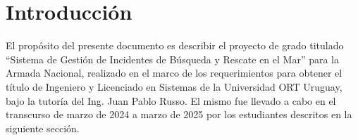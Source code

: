 \chapter{Introducción}\label{ch:introduccion}

El propósito del presente documento es describir el proyecto de grado titulado “Sistema de Gestión de Incidentes de Búsqueda y Rescate en el Mar” para la Armada Nacional, realizado en el marco de los requerimientos para obtener el título de Ingeniero y Licenciado en Sistemas de la Universidad ORT Uruguay, bajo la tutoría del Ing. Juan Pablo Russo. El mismo fue llevado a cabo en el transcurso de marzo de 2024 a marzo de 2025 por los estudiantes descritos en la siguiente sección. 








